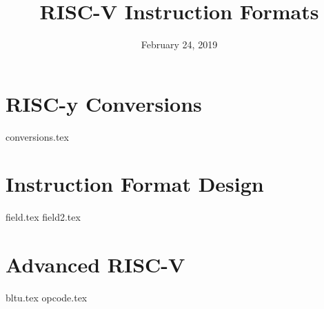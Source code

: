 \documentclass[11pt]{exam}
\title{RISC-V Instruction Formats}
\date{February 24, 2019}
\begin{document}
\maketitle


\section{RISC-y Conversions}
\begin{questions}
{conversions.tex}
\end{questions}
\newpage

\section{Instruction Format Design}
\begin{questions}
{field.tex}
{field2.tex}
\end{questions}
\newpage

\section{Advanced RISC-V}
\begin{questions}
{bltu.tex}
{opcode.tex}
\end{questions}
\newpage
\end{document}
